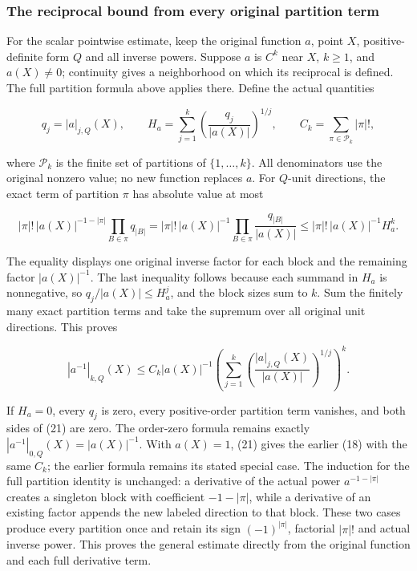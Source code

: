 \documentclass[
  11pt,
]{article}
\begin{document}
\subsubsection{The reciprocal bound from every original partition
term}\label{the-reciprocal-bound-from-every-original-partition-term}

For the scalar pointwise estimate, keep the original function \(a\),
point \(X\), positive-definite form \(Q\) and all inverse powers.
Suppose \(a\) is \(C^k\) near \(X\), \(k\geq1\), and \(a(X)\ne0\);
continuity gives a neighborhood on which its reciprocal is defined. The
full partition formula above applies there. Define the actual quantities

\[
q_j=|a|_{j,Q}(X),\qquad
H_a=\sum_{j=1}^k
\left(\frac{q_j}{|a(X)|}\right)^{1/j},\qquad
C_k=\sum_{\pi\in\mathcal P_k}|\pi|!,
\tag{19}
\]

where \(\mathcal P_k\) is the finite set of partitions of
\(\{1,\ldots,k\}\). All denominators use the original nonzero value; no
new function replaces \(a\). For \(Q\)-unit directions, the exact term
of partition \(\pi\) has absolute value at most

\[
|\pi|!\,|a(X)|^{-1-|\pi|}
\prod_{B\in\pi}q_{|B|}
=|\pi|!\,|a(X)|^{-1}
\prod_{B\in\pi}\frac{q_{|B|}}{|a(X)|}
\leq |\pi|!\,|a(X)|^{-1}H_a^k.
\tag{20}
\]

The equality displays one original inverse factor for each block and the
remaining factor \(|a(X)|^{-1}\). The last inequality follows because
each summand in \(H_a\) is nonnegative, so \(q_j/|a(X)|\leq H_a^j\), and
the block sizes sum to \(k\). Sum the finitely many exact partition
terms and take the supremum over all original unit directions. This
proves

\[
|a^{-1}|_{k,Q}(X)
\leq C_k|a(X)|^{-1}
\left(\sum_{j=1}^k
\left(\frac{|a|_{j,Q}(X)}{|a(X)|}\right)^{1/j}\right)^k.
\tag{21}
\]

If \(H_a=0\), every \(q_j\) is zero, every positive-order partition term
vanishes, and both sides of (21) are zero. The order-zero formula
remains exactly \(|a^{-1}|_{0,Q}(X)=|a(X)|^{-1}\). With \(a(X)=1\), (21)
gives the earlier (18) with the same \(C_k\); the earlier formula
remains its stated special case. The induction for the full partition
identity is unchanged: a derivative of the actual power \(a^{-1-|\pi|}\)
creates a singleton block with coefficient \(-1-|\pi|\), while a
derivative of an existing factor appends the new labeled direction to
that block. These two cases produce every partition once and retain its
sign \((-1)^{|\pi|}\), factorial \(|\pi|!\) and actual inverse power.
This proves the general estimate directly from the original function and
each full derivative term.
\end{document}
